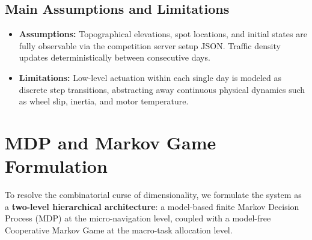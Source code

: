 \documentclass[11pt,a4paper]{article}
\begin{document}
\subsection{Main Assumptions and Limitations}
\begin{itemize}
    \item \textbf{Assumptions:} Topographical elevations, spot locations, and initial states are fully observable via the competition server setup JSON. Traffic density updates deterministically between consecutive days.
    \item \textbf{Limitations:} Low-level actuation within each single day is modeled as discrete step transitions, abstracting away continuous physical dynamics such as wheel slip, inertia, and motor temperature.
\end{itemize}

\section{MDP and Markov Game Formulation}

To resolve the combinatorial curse of dimensionality, we formulate the system as a \textbf{two-level hierarchical architecture}: a model-based finite Markov Decision Process (MDP) at the micro-navigation level, coupled with a model-free Cooperative Markov Game at the macro-task allocation level.
\end{document}
